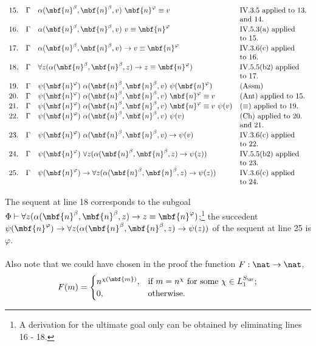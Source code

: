 \begin{enumerate}[1.]
\begin{enumerate}[(a)]
\[\begin{array}{rlll}
15. & \Gamma & \alpha ( \mbf{n}^\beta, \mbf{n}^\beta, v) \ \mbf{n}^\varphi \equiv v & \mbox{IV.3.5 applied to 13.} \cr
\ & \ & \ & \mbox{and 14.} \cr
16. & \Gamma & \alpha ( \mbf{n}^\beta, \mbf{n}^\beta, v) \ v \equiv \mbf{n}^\varphi & \mbox{IV.5.3(a) applied} \cr
\ & \ & \ & \mbox{to 15.} \cr
17. & \Gamma & \alpha ( \mbf{n}^\beta, \mbf{n}^\beta, v) \rightarrow v \equiv \mbf{n}^\varphi & \mbox{IV.3.6(c) applied} \cr
\ & \ & \ & \mbox{to 16.} \cr
18. & \Gamma & \forall z (\alpha ( \mbf{n}^\beta, \mbf{n}^\beta, z) \rightarrow z \equiv \mbf{n}^\varphi) & \mbox{IV.5.5(b2) applied} \cr
\ & \ & \ & \mbox{to 17.} \cr
19. & \Gamma & \psi(\mbf{n}^\varphi) \ \alpha(\mbf{n}^\beta, \mbf{n}^\beta, v) \ \psi(\mbf{n}^\varphi) & \mbox{(Assm)} \cr
20. & \Gamma & \psi(\mbf{n}^\varphi) \ \alpha(\mbf{n}^\beta, \mbf{n}^\beta, v) \ \mbf{n}^\varphi \equiv v & \mbox{(Ant) applied to 15.} \cr
21. & \Gamma & \psi(\mbf{n}^\varphi) \ \alpha(\mbf{n}^\beta, \mbf{n}^\beta, v) \ \mbf{n}^\varphi \equiv v \ \psi(v) & \mbox{($\equiv$) applied to 19.} \cr
22. & \Gamma & \psi(\mbf{n}^\varphi) \ \alpha(\mbf{n}^\beta, \mbf{n}^\beta, v) \ \psi(v) & \mbox{(Ch) applied to 20.} \cr
\ & \ & \ & \mbox{and 21.} \cr
23. & \Gamma & \psi(\mbf{n}^\varphi) \ \alpha(\mbf{n}^\beta, \mbf{n}^\beta, v) \rightarrow \psi(v) & \mbox{IV.3.6(c) applied} \cr
\ & \ & \ & \mbox{to 22.} \cr
24. & \Gamma & \psi(\mbf{n}^\varphi) \ \forall z ( \alpha ( \mbf{n}^\beta, \mbf{n}^\beta, z ) \rightarrow \psi(z) ) & \mbox{IV.5.5(b2) applied} \cr
\ & \ & \ & \mbox{to 23.} \cr
25. & \Gamma & \psi(\mbf{n}^\varphi) \rightarrow \forall z ( \alpha ( \mbf{n}^\beta, \mbf{n}^\beta, z ) \rightarrow \psi(z) ) & \mbox{IV.3.6(c) applied} \cr
\ & \ & \ & \mbox{to 24.}
\end{array}
\]
\end{enumerate}
The sequent at line 18 corresponds to the subgoal $\Phi \vdash \forall z ( \alpha ( \mbf{n}^\beta, \mbf{n}^\beta, z ) \rightarrow z \equiv \mbf{n}^\varphi )$;\footnote{A derivation for the ultimate goal only can be obtained by eliminating lines 16 - 18.} the succedent $\psi(\mbf{n}^\varphi) \rightarrow \forall z ( \alpha ( \mbf{n}^\beta, \mbf{n}^\beta, z ) \rightarrow \psi(z) )$ of the sequent at line 25 is $\varphi$.\\
\ \\
Also note that we could have chosen in the proof the function $F : \nat \to \nat$,
\[
F(m) = \begin{cases}
n^{\chi (\mbf{m}) }, & \mbox{if \(m = n^\chi\) for some \(\chi \in L_1^{S_\ar}\)}; \cr
0,                   & \mbox{otherwise}.

\end{cases}\]
\end{enumerate}
